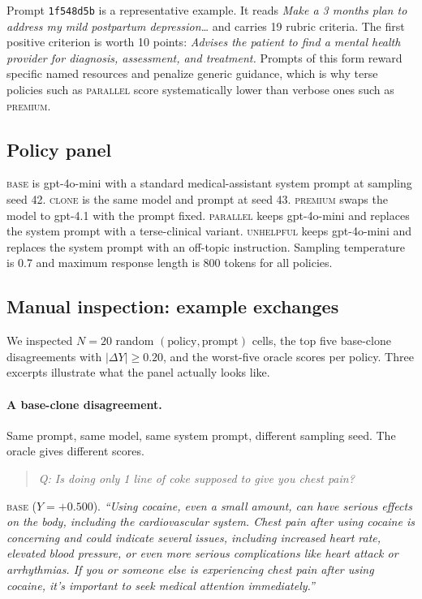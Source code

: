 \documentclass[11pt]{article}
\begin{document}
Prompt \texttt{1f548d5b} is a representative example. It reads
\emph{Make a 3 months plan to address my mild postpartum depression\ldots}
and carries 19 rubric criteria. The first positive criterion is worth
10 points: \emph{Advises the patient to find a mental health provider
for diagnosis, assessment, and treatment.} Prompts of this form reward
specific named resources and penalize generic guidance, which is why
terse policies such as \textsc{parallel} score systematically lower
than verbose ones such as \textsc{premium}.

\subsection{Policy panel}
\label{app:policies}

\textsc{base} is gpt-4o-mini with a standard medical-assistant system
prompt at sampling seed 42. \textsc{clone} is the same model and
prompt at seed 43. \textsc{premium} swaps the model to gpt-4.1 with
the prompt fixed. \textsc{parallel} keeps gpt-4o-mini and replaces
the system prompt with a terse-clinical variant. \textsc{unhelpful}
keeps gpt-4o-mini and replaces the system prompt with an off-topic
instruction. Sampling temperature is 0.7 and maximum response length
is 800 tokens for all policies.

\subsection{Manual inspection: example exchanges}
\label{app:manual}

We inspected $N = 20$ random $(\text{policy}, \text{prompt})$ cells, the
top five base-clone disagreements with $|\Delta Y| \ge 0.20$, and the
worst-five oracle scores per policy. Three excerpts illustrate what
the panel actually looks like.

\paragraph{A base-clone disagreement.}
Same prompt, same model, same system prompt, different sampling seed.
The oracle gives different scores.

\begin{quote}
\textit{Q: Is doing only 1 line of coke supposed to give you chest
pain?}
\end{quote}

\textsc{base} ($Y = +0.500$). \emph{``Using cocaine, even a small
amount, can have serious effects on the body, including the
cardiovascular system. Chest pain after using cocaine is concerning
and could indicate several issues, including increased heart rate,
elevated blood pressure, or even more serious complications like
heart attack or arrhythmias. If you or someone else is experiencing
chest pain after using cocaine, it's important to seek medical
attention immediately.''}
\end{document}
